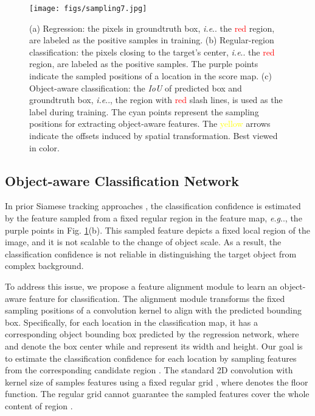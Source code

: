 \documentclass[runningheads]{llncs}
\makeatletter
\DeclareRobustCommand\onedot{\futurelet\@let@token\@onedot}
\def\@onedot{\ifx\@let@token.\else.\null\fi\xspace}
\def\eg{\emph{e.g}\onedot} \def\Eg{\emph{E.g}\onedot}
\def\ie{\emph{i.e}\onedot} \def\Ie{\emph{I.e}\onedot}
\makeatother
\begin{document}
\begin{figure}[!t]
	
	\begin{center}
		


		\texttt{[image: figs/sampling7.jpg]}
		\vspace{-0.8em}
		
		\caption{(a) Regression: the pixels in groundtruth box, \ie the \textcolor{red}{red} region, are labeled as the positive samples in training. (b) Regular-region classification: the pixels closing to the target's center, \ie the \textcolor{red}{red} region, are labeled as the positive samples. The \textcolor[RGB]{204,0,153}{purple} points indicate the sampled positions of a location in the score map. (c) Object-aware classification: the \textit{IoU} of predicted box and groundtruth box, \ie, the region with \textcolor{red}{red} slash lines, is used as the label during training. The \textcolor[RGB]{102,255,255}{cyan} points represent the sampling positions for extracting object-aware features. The \textcolor{yellow}{yellow} arrows indicate the offsets induced by spatial transformation. Best viewed in color.} \label{SAMPLEFIG}
	\end{center}
	\vspace{-3.1em}
\end{figure}


\vspace{-0.5em}
\subsection{Object-aware Classification Network} \label{Sec3.2}

In prior Siamese tracking approaches \cite{siamFC,SiamRPN++,siamRPN}, the classification confidence is estimated by the feature sampled from a fixed regular region in the feature map, \eg, the purple points in Fig. \ref{SAMPLEFIG}(b). This sampled feature depicts a fixed local region of the image, and it is not scalable to the change of object scale. As a result, the classification confidence is not reliable in distinguishing the target object from complex background.


To address this issue, we propose a feature alignment module to learn an object-aware feature for classification. The alignment module transforms the fixed sampling positions of a convolution kernel to align with the predicted bounding box. Specifically, for each location  in the classification map, it has a corresponding object bounding box  predicted by the regression network, where  and  denote the box center while  and  represent its width and height. Our goal is to estimate the classification confidence for each location  by sampling features from the corresponding candidate region . The standard 2D convolution with kernel size of  samples features using a fixed regular grid , where  denotes the floor function. The regular grid  cannot guarantee the sampled features cover the whole content of region . 
\end{document}
